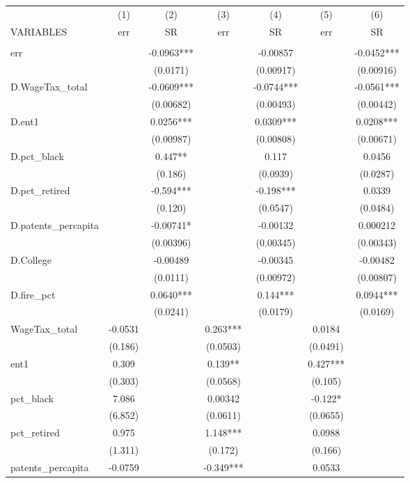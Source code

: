 \begin{tabular}{lcccccc} \hline
 & (1) & (2) & (3) & (4) & (5) & (6) \\
VARIABLES & err & SR & err & SR & err & SR \\ \hline
 &  &  &  &  &  &  \\
err &  & -0.0963*** &  & -0.00857 &  & -0.0452*** \\
 &  & (0.0171) &  & (0.00917) &  & (0.00916) \\
D.WageTax\_total &  & -0.0609*** &  & -0.0744*** &  & -0.0561*** \\
 &  & (0.00682) &  & (0.00493) &  & (0.00442) \\
D.ent1 &  & 0.0256*** &  & 0.0309*** &  & 0.0208*** \\
 &  & (0.00987) &  & (0.00808) &  & (0.00671) \\
D.pct\_black &  & 0.447** &  & 0.117 &  & 0.0456 \\
 &  & (0.186) &  & (0.0939) &  & (0.0287) \\
D.pct\_retired &  & -0.594*** &  & -0.198*** &  & 0.0339 \\
 &  & (0.120) &  & (0.0547) &  & (0.0484) \\
D.patents\_percapita &  & -0.00741* &  & -0.00132 &  & 0.000212 \\
 &  & (0.00396) &  & (0.00345) &  & (0.00343) \\
D.College &  & -0.00489 &  & -0.00345 &  & -0.00482 \\
 &  & (0.0111) &  & (0.00972) &  & (0.00807) \\
D.fire\_pct &  & 0.0640*** &  & 0.144*** &  & 0.0944*** \\
 &  & (0.0241) &  & (0.0179) &  & (0.0169) \\
WageTax\_total & -0.0531 &  & 0.263*** &  & 0.0184 &  \\
 & (0.186) &  & (0.0503) &  & (0.0491) &  \\
ent1 & 0.309 &  & 0.139** &  & 0.427*** &  \\
 & (0.303) &  & (0.0568) &  & (0.105) &  \\
pct\_black & 7.086 &  & 0.00342 &  & -0.122* &  \\
 & (6.852) &  & (0.0611) &  & (0.0655) &  \\
pct\_retired & 0.975 &  & 1.148*** &  & 0.0988 &  \\
 & (1.311) &  & (0.172) &  & (0.166) &  \\
patents\_percapita & -0.0759 &  & -0.349*** &  & 0.0533 &  \\

\end{tabular}
